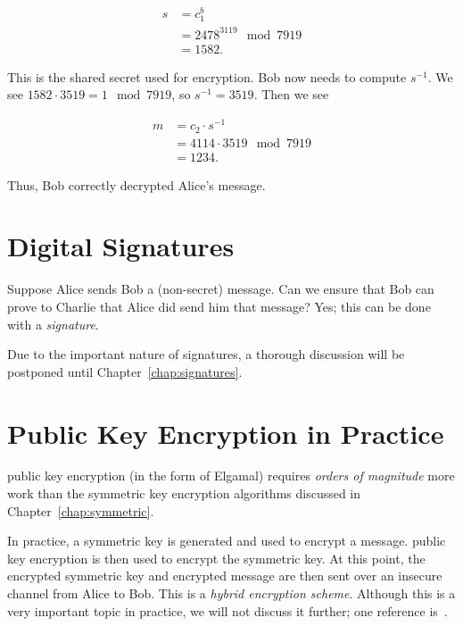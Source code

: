 \begin{example}
\begin{align}
    s &= c_{1}^{b} \nonumber\\
        &= 2478^{3119} \mod 7919 \nonumber\\
        &= 1582.
\end{align}

\noindent
This is the shared secret used for encryption.
Bob now needs to compute $s^{-1}$.
We see $1582 \cdot 3519 = 1 \mod 7919$, so $s^{-1} = 3519$.
Then we see

\begin{align}
    m &= c_{2}\cdot s^{-1} \nonumber\\
        &= 4114\cdot 3519 \mod 7919 \nonumber\\
        &= 1234.
\end{align}

\noindent
Thus, Bob correctly decrypted Alice's message.
\end{example}



\section{Digital Signatures}

Suppose Alice sends Bob a (non-secret) message.
Can we ensure that Bob can prove to Charlie that
Alice did send him that message?
Yes; this can be done with a \emph{\gls{signature}}.

Due to the important nature of \glspl{signature},
a thorough discussion will be postponed until Chapter~\ref{chap:signatures}.



\section{Public Key Encryption in Practice}

\Gls{public key encryption} (in the form of Elgamal)
requires \emph{orders of magnitude} more work than the
\gls{symmetric key encryption} algorithms discussed in
Chapter~\ref{chap:symmetric}.

In practice, a symmetric key is generated and used to encrypt a message.
\Gls{public key encryption} is then used to encrypt the symmetric key.
At this point, the encrypted symmetric key and encrypted message
are then sent over an \gls{insecure channel} from Alice to Bob.
This is a \emph{hybrid encryption scheme}.
Although this is a very important topic in practice,
we will not discuss it further;
one reference is~\cite[Chapter~12.3]{IntroModernCrypto}.

